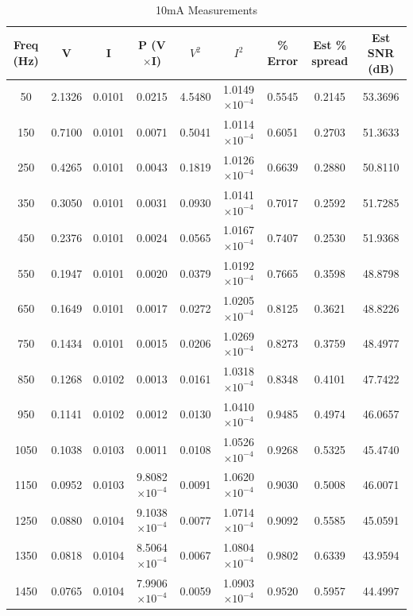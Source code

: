 \begin{table}[htbp]
  \centering
  \caption{10mA Measurements}
  \label{tab:10ma}
  \small
  \begin{tabular}{|c|c|c|c|c|c|c|c|c|}
    \hline
    \textbf{Freq (Hz)} & \textbf{V} & \textbf{I} & \textbf{P (V$\times$I)} & \textbf{$V^2$} & \textbf{$I^2$} & \textbf{\% Error} & \textbf{Est \% spread} & \textbf{Est SNR (dB)} \\
    \hline
    50 & 2.1326 & 0.0101 & 0.0215 & 4.5480 & 1.0149$\times 10^{-4}$ & 0.5545 & 0.2145 & 53.3696 \\
    150 & 0.7100 & 0.0101 & 0.0071 & 0.5041 & 1.0114$\times 10^{-4}$ & 0.6051 & 0.2703 & 51.3633 \\
    250 & 0.4265 & 0.0101 & 0.0043 & 0.1819 & 1.0126$\times 10^{-4}$ & 0.6639 & 0.2880 & 50.8110 \\
    350 & 0.3050 & 0.0101 & 0.0031 & 0.0930 & 1.0141$\times 10^{-4}$ & 0.7017 & 0.2592 & 51.7285 \\
    450 & 0.2376 & 0.0101 & 0.0024 & 0.0565 & 1.0167$\times 10^{-4}$ & 0.7407 & 0.2530 & 51.9368 \\
    \hline
    550 & 0.1947 & 0.0101 & 0.0020 & 0.0379 & 1.0192$\times 10^{-4}$ & 0.7665 & 0.3598 & 48.8798 \\
    650 & 0.1649 & 0.0101 & 0.0017 & 0.0272 & 1.0205$\times 10^{-4}$ & 0.8125 & 0.3621 & 48.8226 \\
    750 & 0.1434 & 0.0101 & 0.0015 & 0.0206 & 1.0269$\times 10^{-4}$ & 0.8273 & 0.3759 & 48.4977 \\
    850 & 0.1268 & 0.0102 & 0.0013 & 0.0161 & 1.0318$\times 10^{-4}$ & 0.8348 & 0.4101 & 47.7422 \\
    950 & 0.1141 & 0.0102 & 0.0012 & 0.0130 & 1.0410$\times 10^{-4}$ & 0.9485 & 0.4974 & 46.0657 \\
    \hline
    1050 & 0.1038 & 0.0103 & 0.0011 & 0.0108 & 1.0526$\times 10^{-4}$ & 0.9268 & 0.5325 & 45.4740 \\
    1150 & 0.0952 & 0.0103 & 9.8082$\times 10^{-4}$ & 0.0091 & 1.0620$\times 10^{-4}$ & 0.9030 & 0.5008 & 46.0071 \\
    1250 & 0.0880 & 0.0104 & 9.1038$\times 10^{-4}$ & 0.0077 & 1.0714$\times 10^{-4}$ & 0.9092 & 0.5585 & 45.0591 \\
    1350 & 0.0818 & 0.0104 & 8.5064$\times 10^{-4}$ & 0.0067 & 1.0804$\times 10^{-4}$ & 0.9802 & 0.6339 & 43.9594 \\
    1450 & 0.0765 & 0.0104 & 7.9906$\times 10^{-4}$ & 0.0059 & 1.0903$\times 10^{-4}$ & 0.9520 & 0.5957 & 44.4997 \\

\end{tabular}
\end{table}
